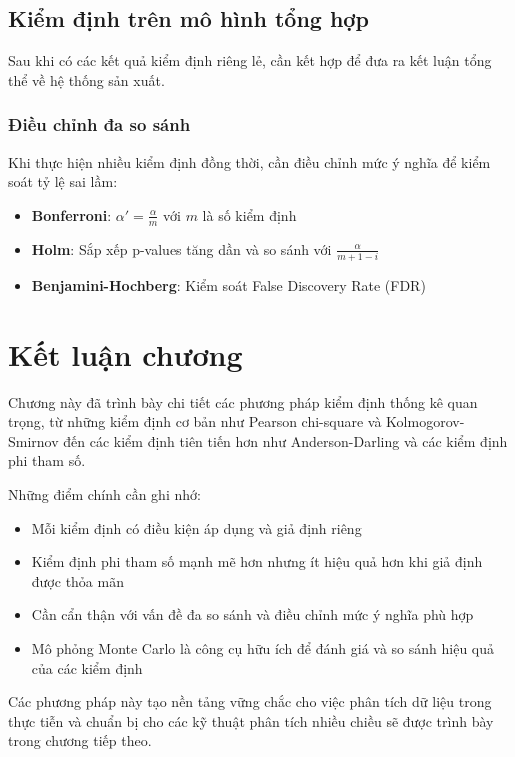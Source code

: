 \subsection{Kiểm định trên mô hình tổng hợp}
Sau khi có các kết quả kiểm định riêng lẻ, cần kết hợp để đưa ra kết luận tổng thể về hệ thống sản xuất.

\subsubsection*{Điều chỉnh đa so sánh}
Khi thực hiện nhiều kiểm định đồng thời, cần điều chỉnh mức ý nghĩa để kiểm soát tỷ lệ sai lầm:

\begin{itemize}
    \item \textbf{Bonferroni}: $\alpha' = \frac{\alpha}{m}$ với $m$ là số kiểm định
    \item \textbf{Holm}: Sắp xếp p-values tăng dần và so sánh với $\frac{\alpha}{m+1-i}$
    \item \textbf{Benjamini-Hochberg}: Kiểm soát False Discovery Rate (FDR)
\end{itemize}



\section{Kết luận chương}

Chương này đã trình bày chi tiết các phương pháp kiểm định thống kê quan trọng, từ những kiểm định cơ bản như Pearson chi-square và Kolmogorov-Smirnov đến các kiểm định tiên tiến hơn như Anderson-Darling và các kiểm định phi tham số. 

Những điểm chính cần ghi nhớ:
\begin{itemize}
    \item Mỗi kiểm định có điều kiện áp dụng và giả định riêng
    \item Kiểm định phi tham số mạnh mẽ hơn nhưng ít hiệu quả hơn khi giả định được thỏa mãn
    \item Cần cẩn thận với vấn đề đa so sánh và điều chỉnh mức ý nghĩa phù hợp
    \item Mô phỏng Monte Carlo là công cụ hữu ích để đánh giá và so sánh hiệu quả của các kiểm định
\end{itemize}

Các phương pháp này tạo nền tảng vững chắc cho việc phân tích dữ liệu trong thực tiễn và chuẩn bị cho các kỹ thuật phân tích nhiều chiều sẽ được trình bày trong chương tiếp theo.
